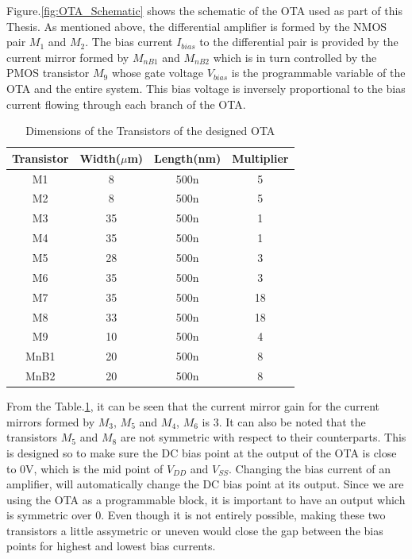 Figure.\ref{fig:OTA_Schematic} \cite{lcmfb_ota} shows the schematic of the OTA used as part of this Thesis. As mentioned above, the differential amplifier is formed by the NMOS pair $M_{1}$ and $M_{2}$. The bias current $I_{bias}$ to the differential pair is provided by the current mirror formed by $M_{nB1}$ and $M_{nB2}$ which is in turn controlled by the PMOS transistor $M_9$ whose gate voltage $V_{bias}$ is the programmable variable of the OTA and the entire system. This bias voltage is inversely proportional to the bias current flowing through each branch of the OTA.

\begin{table} [H]
\centering
\begin{tabular}{@{}cccc@{}}
\toprule
Transistor			& Width($\mu$m)		& Length(nm)		& Multiplier \\ \midrule
M1					& 8					& 500n				& 5			\\
M2					& 8					& 500n				& 5			\\
M3					& 35				& 500n				& 1			\\
M4					& 35				& 500n				& 1			\\
M5					& 28				& 500n				& 3			\\
M6					& 35				& 500n				& 3			\\
M7					& 35				& 500n				& 18		\\
M8					& 33				& 500n				& 18		\\
M9					& 10				& 500n				& 4			\\
MnB1				& 20				& 500n				& 8			\\
MnB2				& 20				& 500n				& 8			\\
\bottomrule
\end{tabular}
\caption{Dimensions of the Transistors of the designed OTA}
\label{tab:OTA_dimensions}
\end{table}
From the Table.\ref{tab:OTA_dimensions}, it can be seen that the current mirror gain for the current mirrors formed by $M_{3}$, $M_{5}$ and $M_{4}$, $M_{6}$ is 3. It can also be noted that the transistors $M_{5}$ and $M_{8}$ are not symmetric with respect to their counterparts. This is designed so to make sure the DC bias point at the output of the OTA is close to 0V, which is the mid point of $V_{DD}$ and $V_{SS}$. Changing the bias current of an amplifier, will automatically change the DC bias point at its output. Since we are using the OTA as a programmable block, it is important to have an output which is symmetric over 0. Even though it is not entirely possible, making these two transistors a little assymetric or uneven would close the gap between the bias points for highest and lowest bias currents.

